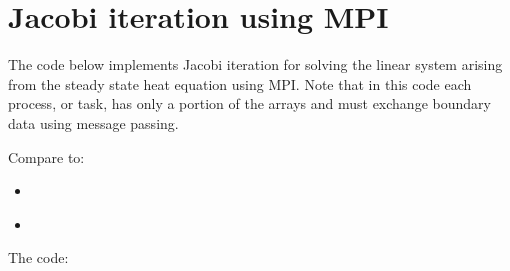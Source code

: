 \documentclass[letterpaper,10pt,english]{sphinxmanual}
\begin{document}
\section{Jacobi iteration using MPI}
\label{jacobi1d_mpi::doc}\label{jacobi1d_mpi:jacobi-iteration-using-mpi}\label{jacobi1d_mpi:jacobi1d-mpi}
The code below implements Jacobi iteration for solving the linear system
arising from the steady state heat equation
using MPI.  Note that in this code each process, or task, has only a portion
of the arrays and must exchange boundary data using message passing.

Compare to:
\begin{itemize}
\item {} 
{\hyperref[jacobi1d_omp1:jacobi1d\string-omp1]{}}

\item {} 
{\hyperref[jacobi1d_omp2:jacobi1d\string-omp2]{}}

\end{itemize}

The code:
\end{document}

